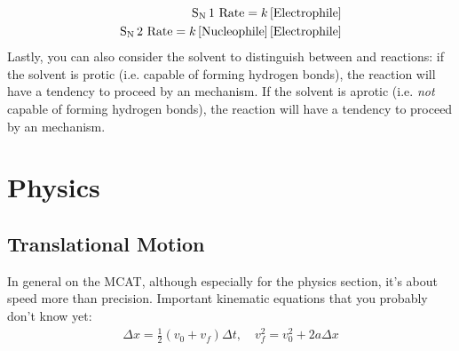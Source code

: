 \documentclass{article}
\theoremstyle{plain}%
\theoremstyle{definition}
\theoremstyle{remark}
\begin{document}
\begin{equation}
\begin{split}
\ce{S_N 1} \text{ Rate}=k\left[\text{Electrophile}\right]\\
\ce{S_N 2} \text{ Rate}=k\left[\text{Nucleophile}\right]\left[\text{Electrophile}\right]
\end{split}
\end{equation}
\noindent Lastly, you can also consider the solvent to distinguish between  and  reactions: if the solvent is protic (i.e. capable of forming hydrogen bonds), the reaction will have a tendency to proceed by an  mechanism. If the solvent is aprotic (i.e. \textit{not} capable of forming hydrogen bonds), the reaction will have a tendency to proceed by an  mechanism.

\section{Physics}
\subsection{Translational Motion}
In general on the MCAT, although especially for the physics section, it's about speed more than precision. Important kinematic equations that you probably don't know yet:
\begin{equation}
\begin{split}
\Delta x = \frac{1}{2}\left(v_0+v_f\right)\Delta t, \quad v_f^2=v_0^2+2a\Delta x
\end{split}
\end{equation}
\end{document}
